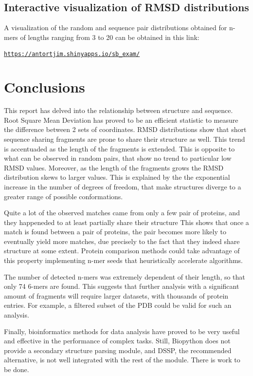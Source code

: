 \documentclass[a4paper, 11pt]{article} %
\begin{document}
\subsection{Interactive visualization of RMSD distributions}

A visualization of the random and sequence pair distributions obtained for n-mers of lengths ranging from 3 to 20 can be obtained in this link:

\color{blue}
\texttt{\href{https://antortjim.shinyapps.io/sb\_exam/}{https://antortjim.shinyapps.io/sb\_exam/}}
\color{black}

\section{Conclusions}

This report has delved into the relationship between structure and sequence. Root Square Mean Deviation has proved to be an efficient statistic to measure the difference between 2 sets of coordinates. RMSD distributions show that short sequence sharing fragments are prone to share their structure as well. This trend is accentuaded as the length of the fragments is extended. This is opposite to what can be observed in random pairs, that show no trend to particular low RMSD values. Moreover, as the length of the fragments grows the RMSD distribution skews to larger values. This is explained by the the exponential increase in the number of degrees of freedom, that make structures diverge to a greater range of possible conformations.

Quite a lot of the observed matches came from only a few pair of proteins, and they happeneded to at least partially share their structure This shows that once a match is found between a pair of proteins, the pair becomes more likely to eventually yield more matches, due precisely to the fact that they indeed share structure at some extent. Protein comparison methods could take advantage of this property implementing n-mer seeds that heuristically accelerate algorithms.

The number of detected n-mers was extremely dependent of their length, so that only 74 6-mers are found. This suggests that further analysis with a significant amount of fragments will require larger datasets, with thousands of protein entries. For example, a filtered subset of the PDB could be valid for such an analysis.

Finally, bioinformatics methods for data analysis have proved to be very useful and effective in the performance of complex tasks. Still, Biopython does not provide a secondary structure parsing module, and DSSP, the recommended alternative, is not well integrated with the rest of the module. There is work to be done. 


%

%
\end{document}

